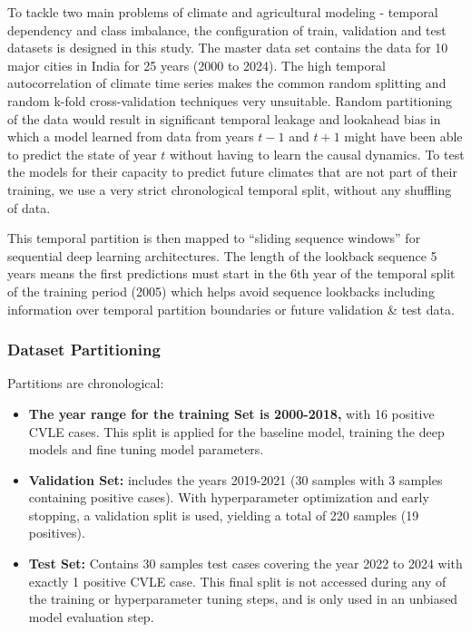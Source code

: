 \documentclass{ieeeaccess}
\begin{document}
To tackle two main problems of climate and agricultural modeling - temporal dependency and class imbalance, the configuration of train, validation and test datasets is designed in this study. The master data set contains the data for 10 major cities in India for 25 years (2000 to 2024). The high temporal autocorrelation of climate time series makes the common random splitting and random k-fold cross-validation techniques very unsuitable. Random partitioning of the data would result in significant temporal leakage and lookahead bias in which a model learned from data from years $t-1$ and $t+1$ might have been able to predict the state of year $t$ without having to learn the causal dynamics. To test the models for their capacity to predict future climates that are not part of their training, we use a very strict chronological temporal split, without any shuffling of data.

This temporal partition is then mapped to ``sliding sequence windows'' for sequential deep learning architectures. The length of the lookback sequence 5 years means the first predictions must start in the 6th year of the temporal split of the training period (2005) which helps avoid sequence lookbacks including information over temporal partition boundaries or future validation \& test data.

\subsubsection{Dataset Partitioning}

Partitions are chronological:

\begin{itemize}

\item \textbf{The year range for the training Set is 2000-2018,} with 16 positive CVLE cases. This split is applied for the baseline model, training the deep models and fine tuning model parameters.

\item \textbf{Validation Set:} includes the years 2019-2021 (30 samples with 3 samples containing positive cases). With hyperparameter optimization and early stopping, a validation split is used, yielding a total of 220 samples (19 positives).

\item \textbf{Test Set:} Contains 30 samples test cases covering the year 2022 to 2024 with exactly 1 positive CVLE case. This final split is not accessed during any of the training or hyperparameter tuning steps, and is only used in an unbiased model evaluation step.

\end{itemize}
\end{document}
